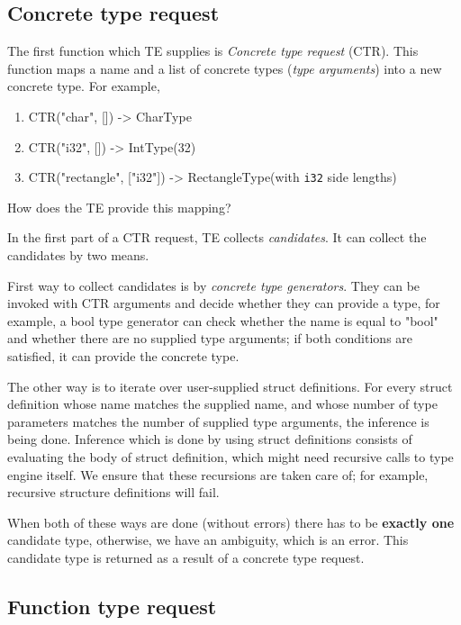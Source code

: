 \documentclass[times, utf8, diplomski]{fer}
\theoremstyle{definition}
\begin{document}
\subsection{Concrete type request}

The first function which TE supplies is \textit{Concrete type request} (CTR). This function maps
a name and a list of concrete types (\textit{type arguments}) into a new concrete type. For example,

\begin{enumerate}
    \item CTR("char", []) -> CharType
    \item CTR("i32", []) -> IntType(32)
    \item CTR("rectangle", ["i32"]) -> RectangleType(with \texttt{i32} side lengths)
\end{enumerate}

How does the TE provide this mapping? 

In the first part of a CTR request, TE collects \textit{candidates}.
It can collect the candidates by two means.

First way to collect candidates is by \textit{concrete type generators}.
They can be invoked with CTR arguments and decide whether they can provide a type, for example,
a bool type generator can check whether the name is equal to "bool" and whether 
there are no supplied type arguments; if both conditions are satisfied,
it can provide the concrete type.

The other way is to iterate over user-supplied struct definitions.
For every struct definition whose name matches the supplied name, 
and whose number of type parameters matches the number of supplied type arguments,
the inference is being done. Inference which is done by 
using struct definitions consists of evaluating the body of struct definition,
which might need recursive calls to type engine itself. We ensure that these
recursions are taken care of; for example, recursive structure definitions will fail.

When both of these ways are done (without errors) there has to be \textbf{exactly one} candidate type,
otherwise, we have an ambiguity, which is an error. This candidate type is returned as a result
of a concrete type request.

\subsection{Function type request}
\end{document}
